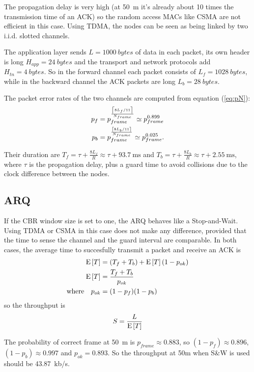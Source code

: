 The propagation delay is very high (at \SI{50}{\m} it's already about
10 times the transmission time of an ACK) so the random access MACs
like CSMA are not efficient in this case. Using TDMA, the nodes can be
seen as being linked by two i.i.d. slotted channels.

The application layer sends $L=\SI{1000}{bytes}$ of data in each
packet, its own header is long $H_{app} = \SI{24}{bytes}$ and the
transport and network protocols add $H_{tn} = \SI{4}{bytes}$. So in
the forward channel each packet consists of $L_f = \SI{1028}{bytes}$,
while in the backward channel the ACK packets are long $L_b
= \SI{28}{bytes}$.

The packet error rates of the two channels are computed
from equation (\ref{eq:pN}):
\begin{align}
p_f &= p_{frame}^\frac{\left\lceil8 L_f / 11\right\rceil}{N_{frame}} \simeq p_{frame}^{0.899} \\
p_b &= p_{frame}^\frac{\left\lceil8 L_b / 11\right\rceil}{N_{frame}} \simeq p_{frame}^{0.025} .
\end{align}

Their duration are $T_f = \tau + \frac{8L_f}{R} \approx \tau
+ \SI{93.7}{\ms}$ and $T_b = \tau + \frac{8L_b}{R} \approx \tau
+ \SI{2.55}{\ms}$, where $\tau$ is the propagation delay, plus a guard
time to avoid collisions due to the clock difference between the
nodes.

\subsection{ARQ}
If the CBR window size is set to one, the ARQ behaves like a
Stop-and-Wait.
%
Using TDMA or CSMA in this case does not make any
difference, provided that the time to sense the channel and the guard
interval are comparable.
%
In both cases, the average time to succesfully transmit a packet and
receive an ACK is
\begin{align}
\operatorname{E}\left[T\right] &= (T_f + T_b) + \operatorname{E}\left[T\right](1-p_{ok}) \\
\operatorname{E}\left[T\right] &= \frac{T_f + T_b}{p_{ok}} \\
\text{where} \quad p_{ok} &= (1-p_f)(1-p_b)
\end{align}
so the throughput is
\begin{equation}
S = \frac{L}{\operatorname{E}\left[T\right]}
\end{equation}

The probability of correct frame at \SI{50}{\m} is $p_{frame} \approx
0.883$, so $(1-p_f) \approx 0.896$, $(1-p_b) \approx 0.997$ and
$p_{ok} = 0.893$. So the throughput at 50m when S\&W is used should
be \SI{43.87}{kb/s}.
